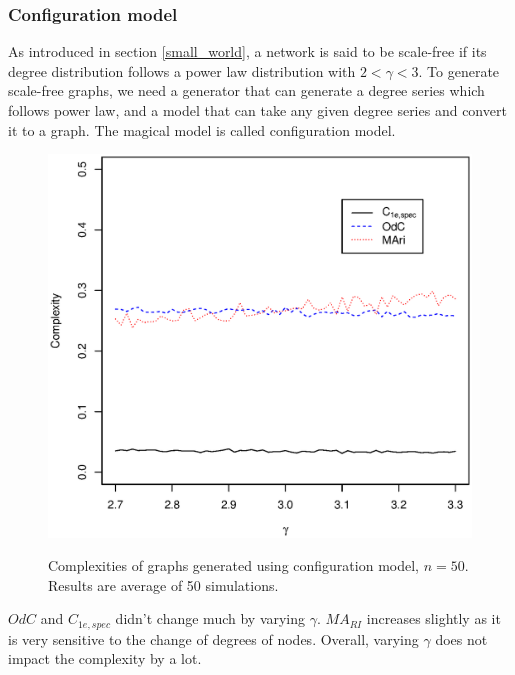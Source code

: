 \documentclass[12pt]{article}
\begin{document}
\subsubsection{Configuration model}
As introduced in section \ref{small_world}, a network is said to be scale-free if its degree distribution follows a power law distribution with $2<\gamma <3$. To generate scale-free graphs, we need a generator that can generate a degree series which follows power law, and a model that can take any given degree series and convert it to a graph. The magical model is called configuration model.\cite{barabási2016network}
\begin{figure}
    \includegraphics[width=\textwidth]{configuration_model.eps}
    \label{fig:configuration_model}
    \caption{Complexities of graphs generated using configuration model, $n=50$. Results are average of 50 simulations.}
\end{figure}
\noindent
$OdC$ and $C_{1e,spec}$ didn't change much by varying $\gamma$. $MA_{RI}$ increases slightly as it is very sensitive to the change of degrees of nodes. Overall, varying $\gamma$ does not impact the complexity by a lot.
\end{document}

